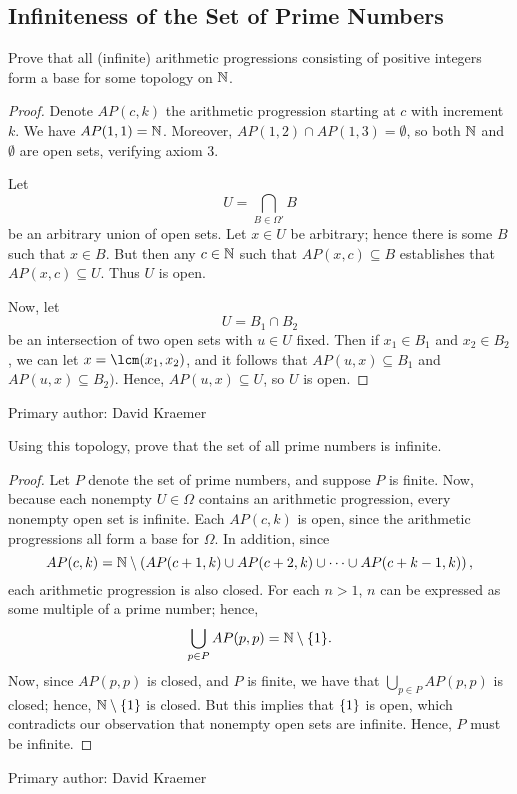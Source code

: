 \subsection{Infiniteness of the Set of Prime Numbers}

\begin{minorEx}
    Prove that all (infinite) arithmetic progressions consisting of positive
    integers form a base for some topology on $\mathbb{N}$.
\end{minorEx}

\begin{proof}
    Denote $AP(c,k)$ the arithmetic progression starting at $c$ with increment
    $k$. We have $AP(1,1) = \mathbb{N}$. Moreover, $AP(1,2) \cap AP(1,3) = \emptyset$,
    so both $\mathbb{N}$ and $\emptyset$ are open sets, verifying axiom 3.

    Let 
    \[
        U = \bigcap_{B \in \Omega'} B
    \]
    be an arbitrary union of open sets. Let $x \in U$ be arbitrary; hence there
    is some $B$ such that $x \in B$. But then any $c \in \mathbb{N}$ such that $AP(x,
    c) \subseteq B$ establishes that $AP(x, c) \subseteq U$. Thus $U$ is open.

    Now, let
    \[
        U = B_1 \cap B_2
    \]
    be an intersection of two open sets with $u \in U$ fixed. Then if $x_1 \in
    B_1$ and $x_2 \in B_2$, we can let $x = \lcm(x_1, x_2)$, and it follows that
    $AP(u,x) \subseteq B_1$ and $AP(u,x) \subseteq B_2)$. Hence, $AP(u, x)
    \subseteq U$, so $U$ is open.
\end{proof}

Primary author: David Kraemer

\begin{minorEx}
    Using this topology, prove that the set of all prime numbers is infinite.
\end{minorEx}

\begin{proof}
    Let $P$ denote the set of prime numbers, and suppose $P$ is finite. Now,
    because each nonempty $U \in \Omega$ contains an arithmetic progression,
    every nonempty open set is infinite. Each $AP(c,k)$ is open, since the
    arithmetic progressions all form a base for $\Omega$. In addition, since
    \[
        AP(c, k) = \mathbb{N} \setminus \left( AP(c+1,k) \cup AP(c+2, k) \cup \cdots
        \cup AP(c+k-1, k) \right),
    \]
    each arithmetic progression is also closed. For each $n > 1$, $n$ can be
    expressed as some multiple of a prime number; hence,
    \[
        \bigcup_{p \in P} AP(p,p) = \mathbb{N} \setminus \{1\}.
    \]
    Now, since $AP(p,p)$ is closed, and $P$ is finite, we have that $\bigcup_{p
    \in P} AP(p,p)$ is closed; hence, $\mathbb{N}\setminus\{1\}$ is closed. But this
    implies that $\{1\}$ is open, which contradicts our observation that
    nonempty open sets are infinite. Hence, $P$ must be infinite.
\end{proof}

Primary author: David Kraemer
